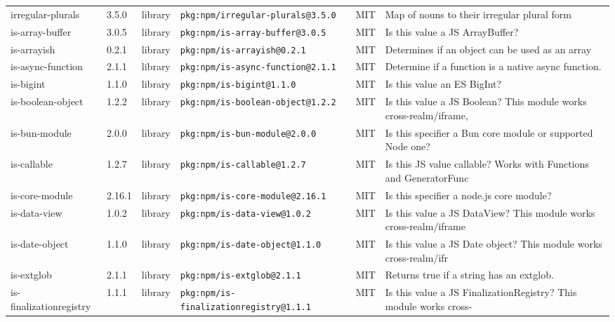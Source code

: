 \documentclass[11pt,a4paper]{article}
\begin{document}
\begin{longtable}{|p{4cm}|p{2cm}|p{1.6cm}|p{5cm}|p{1.5cm}|p{3.5cm}|}
\raggedright irregular-plurals & 3.5.0 & library & \small\texttt{pkg:npm/irregular-plurals@3.5.0} & MIT & \small Map of nouns to their irregular plural form \\
\raggedright is-array-buffer & 3.0.5 & library & \small\texttt{pkg:npm/is-array-buffer@3.0.5} & MIT & \small Is this value a JS ArrayBuffer? \\
\raggedright is-arrayish & 0.2.1 & library & \small\texttt{pkg:npm/is-arrayish@0.2.1} & MIT & \small Determines if an object can be used as an array \\
\raggedright is-async-function & 2.1.1 & library & \small\texttt{pkg:npm/is-async-function@2.1.1} & MIT & \small Determine if a function is a native async function. \\
\raggedright is-bigint & 1.1.0 & library & \small\texttt{pkg:npm/is-bigint@1.1.0} & MIT & \small Is this value an ES BigInt? \\
\raggedright is-boolean-object & 1.2.2 & library & \small\texttt{pkg:npm/is-boolean-object@1.2.2} & MIT & \small Is this value a JS Boolean? This module works cross-realm/iframe, \\
\raggedright is-bun-module & 2.0.0 & library & \small\texttt{pkg:npm/is-bun-module@2.0.0} & MIT & \small Is this specifier a Bun core module or supported Node one? \\
\raggedright is-callable & 1.2.7 & library & \small\texttt{pkg:npm/is-callable@1.2.7} & MIT & \small Is this JS value callable? Works with Functions and GeneratorFunc \\
\raggedright is-core-module & 2.16.1 & library & \small\texttt{pkg:npm/is-core-module@2.16.1} & MIT & \small Is this specifier a node.js core module? \\
\raggedright is-data-view & 1.0.2 & library & \small\texttt{pkg:npm/is-data-view@1.0.2} & MIT & \small Is this value a JS DataView? This module works cross-realm/iframe \\
\raggedright is-date-object & 1.1.0 & library & \small\texttt{pkg:npm/is-date-object@1.1.0} & MIT & \small Is this value a JS Date object? This module works cross-realm/ifr \\
\raggedright is-extglob & 2.1.1 & library & \small\texttt{pkg:npm/is-extglob@2.1.1} & MIT & \small Returns true if a string has an extglob. \\
\raggedright is-finalizationregistry & 1.1.1 & library & \small\texttt{pkg:npm/is-finalizationregistry@1.1.1} & MIT & \small Is this value a JS FinalizationRegistry? This module works cross- \\

\end{longtable}
\end{document}

